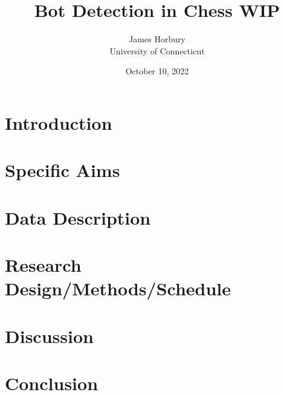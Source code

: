 \documentclass[12pt]{article}
\title{Bot Detection in Chess WIP}
\author{James Horbury\\
    University of Connecticut
}
\date{October 10, 2022}
\begin{document}
\maketitle

\section*{Introduction}
\label{sec:intro}

\section*{Specific Aims}
\label{sec:spec}

\section*{Data Description}
\label{sec:data}

\section*{Research Design/Methods/Schedule}
\label{sec:res}

\section*{Discussion}
\label{sec:disc}

\section*{Conclusion}
\label{sec:conc}



\end{document}
